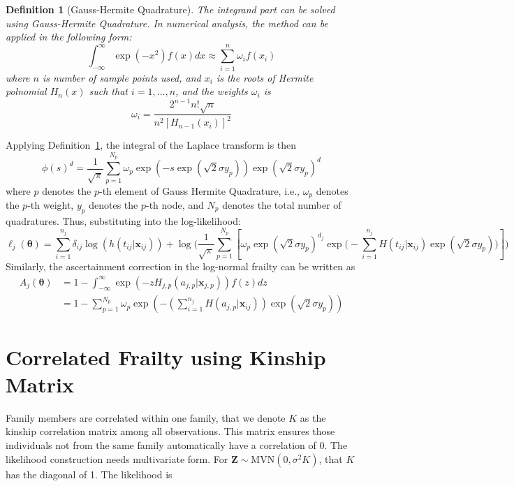 \documentclass[preprint,12pt]{elsarticle}
\newtheorem{defn}{Definition}
\begin{document}
\begin{defn}[Gauss-Hermite Quadrature]\label{defn:gausshermite}
    The integrand part can be solved using Gauss-Hermite Quadrature. In numerical analysis, the method can be applied in the following form:
\begin{equation}
    \int_{-\infty}^{\infty}\exp(-x^2)f(x)dx\approx \sum_{i=1}^n\omega_i f(x_i)
\end{equation}
where $n$ is number of sample points used, and $x_i$ is the roots of Hermite polnomial $H_n (x)$ such that $i=1, ..., n$, and the weights $\omega_i$ is 
\begin{equation}
    \omega_i=\frac{2^{n-1}n!\sqrt{n}}{n^2[H_{n-1}(x_i)]^2}
\end{equation}
\end{defn}

\noindent
Applying Definition~\ref{defn:gausshermite}, the integral of the Laplace transform is then
\begin{equation}
    \phi(s)^d=\frac{1}{\sqrt{\pi}}\sum_{p=1}^{N_p}\omega_p\exp(-s\exp(\sqrt{2}\sigma y_p))\exp(\sqrt{2}\sigma y_p)^d
\end{equation}
where $p$ denotes the $p$-th element of Gauss Hermite Quadrature, i.e., $\omega_p$ denotes the $p$-th weight, $y_p$ denotes the $p$-th node, and $N_p$ denotes the total number of quadratures. Thus, substituting into the log-likelihood:
\begin{equation}
    \ell_j(\boldsymbol{\theta})=\sum_{i=1}^{n_j}\delta_{ij}\log(h(t_{ij}|\mathbf{x}_{ij}))+\log\Big (\frac{1}{\sqrt{\pi}}\sum_{p=1}^{N_p}\left [\omega_p\exp(\sqrt{2}\sigma y_p)^{d_j}\exp\Big (-\sum_{i=1}^{n_j}H(t_{ij}|\mathbf{x}_{ij})\exp(\sqrt{2}\sigma y_p)\Big )\right ]\Big )
\end{equation}
Similarly, the ascertainment correction in the log-normal frailty can be written as 
\begin{align}
    A_j(\boldsymbol{\theta})&=1-\int_{-\infty}^{\infty} \exp(-z H_{j,p}(a_{j,p}|\mathbf{x}_{j,p}))f(z)dz\\
    &=1-\sum_{p=1}^{N_p}\omega_p \exp\left (-(\sum_{i=1}^{n_j} H(a_{j,p}|\mathbf{x}_{ij}))\exp (\sqrt{2}\sigma y_{p})\right )
\end{align}

\section{Correlated Frailty using Kinship Matrix}
Family members are correlated within one family, that we denote $K$ as the kinship correlation matrix among all observations. This matrix ensures those individuals not from the same family automatically have a correlation of 0. The likelihood construction needs multivariate form. For $\mathbf{Z}\sim\text{MVN}(0,\sigma^2K)$, that $K$ has the diagonal of 1. The likelihood is 
\end{document}

